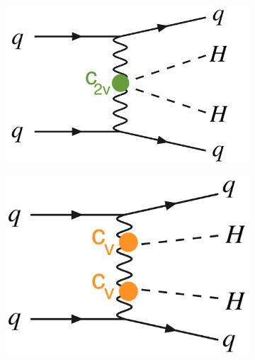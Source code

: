 \begin{figure}[ht]
        \centering
        \begin{subfigure}[b]{0.33\textwidth}
            \centering
            \includegraphics[width=\textwidth]{MSc_Thesis/fig/vbf1.png}
            \vspace{-0.5cm}
            \label{vbfHH1}
        \end{subfigure}
        \begin{subfigure}[b]{0.3\textwidth}  
            \centering 
            \includegraphics[width=\textwidth]{MSc_Thesis/fig/vbf2.png}
            \vspace{-0.5cm}
            \label{vbfHH2}
        \end{subfigure}
        \begin{subfigure}[b]{0.35\textwidth}  

\end{subfigure}
\end{figure}
